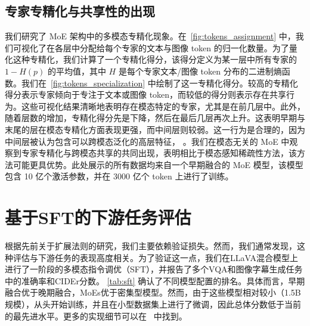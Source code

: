 \begin{figure}[t!]
    \begin{minipage}[t]{0.58\textwidth}
        
    \end{minipage}
    \hfill
    \begin{minipage}[t]{0.38\textwidth}
        
    \end{minipage}
\end{figure}
\subsection{专家专精化与共享性的出现}  
\label{sec:specialization}  
我们研究了 MoE 架构中的多模态专精化现象。在~\cref{fig:tokens_assignment} 中，我们可视化了在各层中分配给每个专家的文本与图像 token 的归一化数量。为了量化这种专精化，我们计算了一个专精化得分，该得分定义为某一层中所有专家的 $1-H(p)$ 的平均值，其中 $H$ 是每个专家文本/图像 token 分布的二进制熵函数。我们在~\cref{fig:tokens_specialization} 中绘制了这一专精化得分。较高的专精化得分表示专家倾向于专注于文本或图像 token，而较低的得分则表示存在共享行为。这些可视化结果清晰地表明存在模态特定的专家，尤其是在前几层中。此外，随着层数的增加，专精化得分先是下降，然后在最后几层再次上升。这表明早期与末尾的层在模态专精化方面表现更强，而中间层则较弱。这一行为是合理的，因为中间层被认为包含可以跨模态泛化的高层特征， 。我们在模态无关的 MoE 中观察到专家专精化与跨模态共享的共同出现，表明相比于模态感知稀疏性方法，该方法可能更具优势。此处展示的所有数据均来自一个早期融合的 MoE 模型，该模型包含 10 亿个激活参数，并在 3000 亿个 token 上进行了训练。



\vspace{-1cm}
\section{基于SFT的下游任务评估}
根据先前关于扩展法则的研究，我们主要依赖验证损失。然而，我们通常发现，这种评估与下游任务的表现高度相关。为了验证这一点，我们在LLaVA混合模型上进行了一阶段的多模态指令调优（SFT）\citep{liu2024improvedllava}，并报告了多个VQA和图像字幕生成任务中的准确率和CIDEr分数。 \cref{tab:sft} 确认了不同模型配置的排名。具体而言，早期融合优于晚期融合，MoEs优于密集型模型。然而，由于这些模型相对较小（1.5B规模），从头开始训练，并且在小型数据集上进行了微调，因此总体分数低于当前的最先进水平。更多的实现细节可以在~ 中找到。

\begin{figure}[t!]
    \begin{minipage}[t]{0.58\textwidth}
        
    \end{minipage}
    \hfill
    \begin{minipage}[t]{0.38\textwidth}
        
    \end{minipage}
    \vspace{3mm}
\end{figure}

